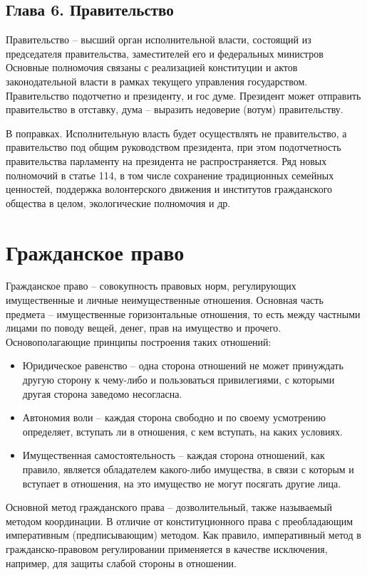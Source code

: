 \documentclass[a4paper, 12pt]{article}
\begin{document}
\subsection{Глава 6. Правительство}
Правительство -- высший орган исполнительной власти, состоящий из председателя правительства, заместителей его и федеральных министров Основные полномочия связаны с реализацией конституции и актов законодательной власти в рамках текущего управления государством. Правительство подотчетно и президенту, и гос думе. Президент может отправить правительство в отставку, дума -- выразить недоверие (вотум) правительству. 

В поправках.
Исполнительную власть будет осуществлять не правительство, а правительство под общим руководством президента, при этом подотчетность правительства парламенту на президента не распространяется. 
Ряд новых полномочий в статье 114, в том числе сохранение традиционных семейных ценностей, поддержка волонтерского движения и институтов гражданского общества в целом, экологические полномочия и др. 

\section{Гражданское право}
Гражданское право -- совокупность правовых норм, регулирующих имущественные и личные неимущественные отношения. 
Основная часть предмета -- имущественные горизонтальные отношения, то есть между частными лицами по поводу вещей, денег, прав на имущество и прочего. 
Основополагающие принципы построения таких отношений:
\begin{itemize}
\item Юридическое равенство -- одна сторона отношений не может принуждать другую сторону к чему-либо и пользоваться привилегиями, с которыми другая сторона заведомо несогласна.
\item Автономия воли -- каждая сторона свободно и по своему усмотрению определяет, вступать ли в отношения, с кем вступать, на каких условиях. 
\item Имущественная самостоятельность -- каждая сторона отношений, как правило, является обладателем какого-либо имущества, в связи с которым и вступает в отношения, на это имущество не могут посягать другие лица. 
\end{itemize}
Основной метод гражданского права -- дозволительный, также называемый методом координации. 
В отличие от конституционного права с преобладающим императивным (предписывающим) методом. Как правило, императивный метод в гражданско-правовом регулировании применяется в качестве исключения, например, для защиты слабой стороны в отношении. 
\end{document}
